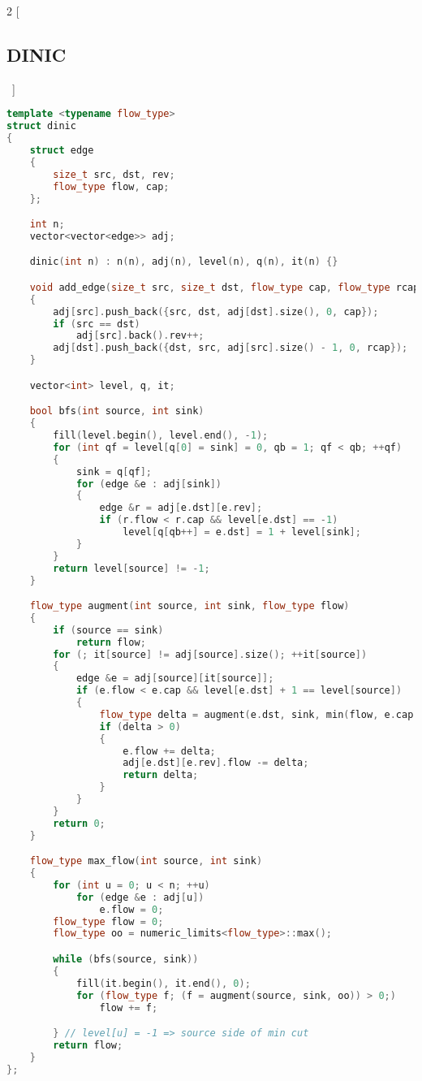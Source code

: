 \documentclass[leter]{amsart}
\begin{document}
\begin{multicols}{2}
[\subsection{DINIC}\ ]
\begin{lstlisting}[language=C++]
template <typename flow_type>
struct dinic
{
    struct edge
    {
        size_t src, dst, rev;
        flow_type flow, cap;
    };

    int n;
    vector<vector<edge>> adj;

    dinic(int n) : n(n), adj(n), level(n), q(n), it(n) {}

    void add_edge(size_t src, size_t dst, flow_type cap, flow_type rcap = 0)
    {
        adj[src].push_back({src, dst, adj[dst].size(), 0, cap});
        if (src == dst)
            adj[src].back().rev++;
        adj[dst].push_back({dst, src, adj[src].size() - 1, 0, rcap});
    }

    vector<int> level, q, it;

    bool bfs(int source, int sink)
    {
        fill(level.begin(), level.end(), -1);
        for (int qf = level[q[0] = sink] = 0, qb = 1; qf < qb; ++qf)
        {
            sink = q[qf];
            for (edge &e : adj[sink])
            {
                edge &r = adj[e.dst][e.rev];
                if (r.flow < r.cap && level[e.dst] == -1)
                    level[q[qb++] = e.dst] = 1 + level[sink];
            }
        }
        return level[source] != -1;
    }

    flow_type augment(int source, int sink, flow_type flow)
    {
        if (source == sink)
            return flow;
        for (; it[source] != adj[source].size(); ++it[source])
        {
            edge &e = adj[source][it[source]];
            if (e.flow < e.cap && level[e.dst] + 1 == level[source])
            {
                flow_type delta = augment(e.dst, sink, min(flow, e.cap - e.flow));
                if (delta > 0)
                {
                    e.flow += delta;
                    adj[e.dst][e.rev].flow -= delta;
                    return delta;
                }
            }
        }
        return 0;
    }

    flow_type max_flow(int source, int sink)
    {
        for (int u = 0; u < n; ++u)
            for (edge &e : adj[u])
                e.flow = 0;
        flow_type flow = 0;
        flow_type oo = numeric_limits<flow_type>::max();

        while (bfs(source, sink))
        {
            fill(it.begin(), it.end(), 0);
            for (flow_type f; (f = augment(source, sink, oo)) > 0;)
                flow += f;

        } // level[u] = -1 => source side of min cut
        return flow;
    }
};

\end{lstlisting}
\end{multicols}
\end{document}
